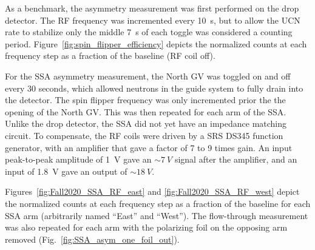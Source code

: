 As a benchmark, the asymmetry measurement was first performed on the drop detector. The RF frequency was incremented every \qty{10}{s}, but to allow the UCN rate to stabilize only the middle \qty{7}{s} of each toggle was considered a counting period. Figure~\ref{fig:spin_flipper_efficiency} depicts the normalized \ucn counts at each frequency step as a fraction of the baseline (RF coil off). 

For the SSA asymmetry measurement, the North GV was toggled on and off every 30 seconds, which allowed neutrons in the guide system to fully drain into the detector. The spin flipper frequency was only incremented prior the the opening of the North GV. This was then repeated for each arm of the SSA. Unlike the drop detector, the SSA did not yet have an impedance matching circuit. To compensate, the RF coils were driven by a SRS DS345 function generator, with an amplifier that gave a factor of 7 to 9 times gain. An input peak-to-peak amplitude of \qty{1}{V} gave an $\sim\qty{7}{V}$ signal after the amplifier, and an input of \qty{1.8}{V} gave an output of $\sim\qty{18}{V}$.

Figures~\ref{fig:Fall2020_SSA_RF_east} and \ref{fig:Fall2020_SSA_RF_west} depict the  normalized \ucn counts at each frequency step as a fraction of the baseline for each SSA arm (arbitrarily named ``East'' and ``West''). The flow-through measurement was also repeated for each arm with the polarizing foil on the opposing arm removed (Fig.~\ref{fig:SSA_asym_one_foil_out}).





